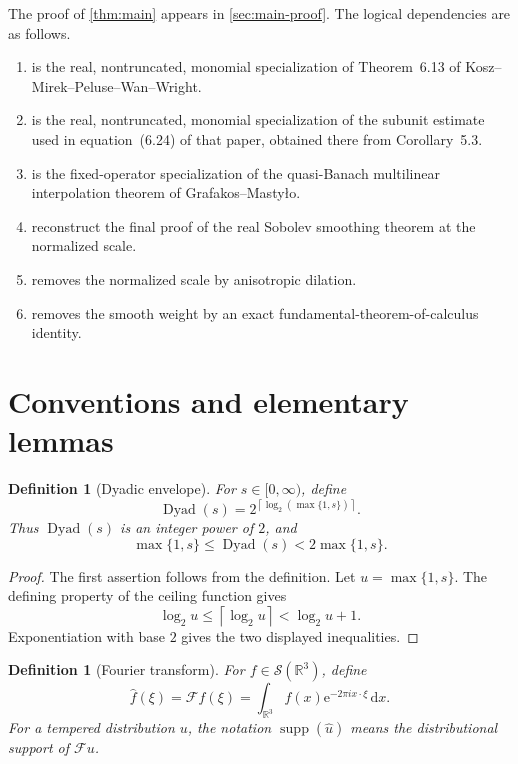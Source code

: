 \documentclass[11pt]{article}
\newtheorem{definition}[theorem]{Definition}
\newcommand{\R}{\mathbb{R}}
\newcommand{\Sch}{\mathcal{S}}
\newcommand{\supp}{\operatorname{supp}}
\newcommand{\Dyad}{\operatorname{Dyad}}
\newcommand{\F}{\mathcal{F}}
\newcommand{\e}{\mathrm{e}}
\newcommand{\dd}{\,\mathrm{d}}
\begin{document}
The proof of \cref{thm:main} appears in \cref{sec:main-proof}.  The logical dependencies are as follows.

\begin{enumerate}
\item {} is the real, nontruncated, monomial specialization of Theorem~6.13 of Kosz--Mirek--Peluse--Wan--Wright.
\item {} is the real, nontruncated, monomial specialization of the subunit estimate used in equation~(6.24) of that paper, obtained there from Corollary~5.3.
\item {} is the fixed-operator specialization of the quasi-Banach multilinear interpolation theorem of Grafakos--Masty\l o.
\item {} reconstruct the final proof of the real Sobolev smoothing theorem at the normalized scale.
\item {} removes the normalized scale by anisotropic dilation.
\item {} removes the smooth weight by an exact fundamental-theorem-of-calculus identity.
\end{enumerate}

\section{Conventions and elementary lemmas}

\begin{definition}[Dyadic envelope]\label{def:dyadic-envelope}
For \(s\in[0,\infty)\), define
\[
\Dyad(s)=2^{\left\lceil\log_2(\max\{1,s\})\right\rceil}.
\]
Thus \(\Dyad(s)\) is an integer power of \(2\), and
\[
\max\{1,s\}\leq\Dyad(s)<2\max\{1,s\}.
\]
\end{definition}

\begin{proof}
The first assertion follows from the definition.  Let \(u=\max\{1,s\}\).  The defining property of the ceiling function gives
\[
\log_2 u\leq\left\lceil\log_2 u\right\rceil<\log_2 u+1.
\]
Exponentiation with base \(2\) gives the two displayed inequalities.
\end{proof}

\begin{definition}[Fourier transform]\label{def:fourier}
For \(f\in\Sch(\R^3)\), define
\[
\widehat f(\xi)=\F f(\xi)=\int_{\R^3}f(x)\e^{-2\pi i x\cdot\xi}\dd x.
\]
For a tempered distribution \(u\), the notation \(\supp(\widehat u)\) means the distributional support of \(\F u\).
\end{definition}
\end{document}
